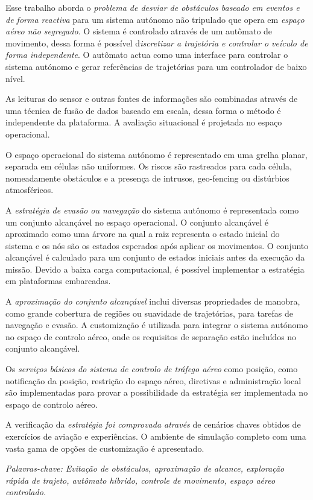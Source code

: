\noindent Esse trabalho aborda o \textit{problema de desviar de obstáculos baseado em eventos e de forma reactiva} para um sistema autónomo não tripulado que opera em \textit{espaço aéreo não segregado}. O sistema é controlado através de um autômato de movimento, dessa forma é possível d\textit{iscretizar a trajetória e controlar o veículo de forma independente}. O autômato actua como uma interface  para controlar o sistema autónomo e gerar referências de trajetórias para um controlador de baixo nível.

As leituras do sensor e outras fontes de informações são combinadas através de uma técnica de fusão de dados baseado em escala, dessa forma o método é independente da plataforma. A avaliação situacional é projetada no espaço operacional.


O espaço operacional do sistema autónomo é representado em uma grelha planar, separada em células não uniformes. Os riscos são rastreados para cada célula, nomeadamente obstáculos e a presença de intrusos, geo-fencing ou distúrbios atmosféricos.


A\textit{ estratégia de evasão ou navegação} do sistema autônomo é representada como um conjunto alcançável no espaço operacional. O conjunto alcançável é aproximado como uma árvore na qual a raiz representa o estado inicial do sistema e os nós são os estados esperados após aplicar os movimentos. O conjunto alcançável é calculado para um conjunto de estados iniciais antes da execução da missão. Devido a baixa carga computacional, é possível implementar a estratégia em plataformas embarcadas.

A \textit{aproximação do conjunto alcançável} inclui diversas propriedades de manobra, como grande cobertura de regiões ou suavidade de trajetórias, para tarefas de navegação e evasão. A customização é utilizada para integrar o sistema autónomo no espaço de controlo aéreo, onde os requisitos de separação estão incluídos no conjunto alcançável.

Os \textit{serviços básicos do sistema de controlo de tráfego aéreo} como posição, como notificação da posição, restrição do espaço aéreo, diretivas e administração local são implementadas para provar a possibilidade da estratégia ser implementada no espaço de controlo aéreo.


A verificação da \textit{estratégia foi comprovada através} de cenários chaves obtidos de exercícios de  aviação e experiências. O ambiente de simulação completo com uma vasta gama de opções de customização é apresentado.

\vskip 16pt
\noindent\emph{Palavras-chave: Evitação de obstáculos, aproximação de alcance, exploração rápida de trajeto, autômato híbrido, controle de movimento, espaço aéreo controlado.}